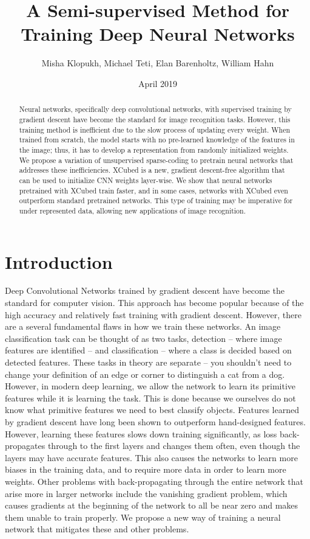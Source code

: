 \documentclass[twocolumn]{article}
\title{A Semi-supervised Method for Training Deep Neural Networks}
\author{Misha Klopukh, Michael Teti, Elan Barenholtz, William Hahn}
\affil{Machine Perception and Cognitive Robotics Laboratory, Florida Atlantic University}
\date{April 2019}
\begin{document}
\maketitle




\begin{abstract}
    Neural networks, specifically deep convolutional networks, with supervised training by gradient descent have become the standard for image recognition tasks. However, this training method is inefficient due to the slow process of updating every weight. When trained from scratch, the model starts with no pre-learned knowledge of the features in the image; thus, it has to develop a representation from randomly initialized weights. We propose a variation of unsupervised sparse-coding to pretrain neural networks that addresses these inefficiencies. XCubed is a new, gradient descent-free algorithm that can be used to initialize CNN weights layer-wise. We show that neural networks pretrained with XCubed train faster, and in some cases, networks with XCubed even outperform standard pretrained networks. This type of training may be imperative for under represented data, allowing new applications of image recognition.
\end{abstract}


\section{Introduction}

Deep Convolutional Networks trained by gradient descent have become the standard for computer vision. This approach has become popular because of the high accuracy and relatively fast training with gradient descent.\cite{alexnet}\cite{Lecun98gradient} However, there are a several fundamental flaws in how we train these networks. An image classification task can be thought of as two tasks, detection -- where image features are identified -- and classification -- where a class is decided based on detected features. These tasks in theory are separate -- you shouldn't need to change your definition of an edge or corner to distinguish a cat from a dog.\cite{cowardtowards} However, in modern deep learning, we allow the network to learn its primitive features while it is learning the task. This is done because we ourselves do not know what primitive features we need to best classify objects. Features learned by gradient descent have long been shown to outperform hand-designed features.\cite{learnvcraft} However, learning these features slows down training significantly, as loss back-propagates through to the first layers and changes them often, even though the layers may have accurate features. This also causes the networks to learn more biases in the training data, and to require more data in order to learn more weights. Other problems with back-propagating through the entire network that arise more in larger networks include the vanishing gradient problem, which causes gradients at the beginning of the network to all be near zero and makes them unable to train properly.\cite{vanishinggradients}\cite{learningproblems} We propose a new way of training a neural network that mitigates these and other problems.
\end{document}
